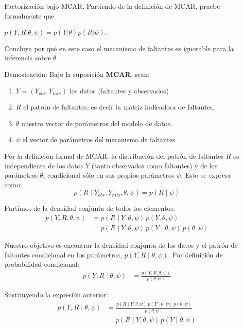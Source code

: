 \documentclass[a4paper,11pt]{article}
\begin{document}
\newpage
\begin{ejercicio}{4}
Factorización bajo MCAR.
Partiendo de la definición de MCAR, pruebe formalmente que

$p(Y, R | \theta, \psi) = p(Y | \theta) p(R | \psi)$.

Concluya por qué en este caso el mecanismo de faltantes es ignorable para la inferencia
sobre $\theta$.
\end{ejercicio}
\begin{demostracion}{Demostración:}
Bajo la suposición \textbf{MCAR}, sean:
\begin{enumerate}
    \item $Y=(Y_{obs},Y_{mis} )$ los datos (faltantes y observados)
    \item $R$ el patrón de faltantes, es decir la matriz indicadora de faltantes.
    \item $\theta$ nuestro vector de parámetros del modelo de datos.
    \item $\psi$ el vector de parámetros del mecanismo de faltantes.
\end{enumerate}

Por la definición formal de MCAR, la distribución del patrón de faltantes $R$ es independiente de los datos $Y$ (tanto observados como faltantes) y de los parámetros $\theta$, condicional sólo en sus propios parámetros $\psi$. Esto se expresa como:
\[
p(R \mid Y_{obs}, Y_{mis}, \theta, \psi) = p(R \mid \psi)
\]

Partimos de la densidad conjunta de todos los elementos:
\begin{align*}
    p(Y, R, \theta, \psi) &= p(R \mid Y, \theta, \psi) \, p(Y, \theta, \psi) \\
    &= p(R \mid Y, \theta, \psi) \, p(Y \mid \theta, \psi) \, p(\theta, \psi)
\end{align*}

Nuestro objetivo es encontrar la densidad conjunta de los datos y el patrón de faltantes condicional en los parámetros, $p(Y, R \mid \theta, \psi)$. Por definición de probabilidad condicional:
\begin{align*}
    p(Y, R \mid \theta, \psi) &= \frac{p(Y, R, \theta, \psi)}{p(\theta, \psi)}
\end{align*}

Sustituyendo la expresión anterior:
\begin{align*}
    p(Y, R \mid \theta, \psi) &= \frac{p(R \mid Y, \theta, \psi) \, p(Y \mid \theta, \psi) \, p(\theta, \psi)}{p(\theta, \psi)} \\
    &= p(R \mid Y, \theta, \psi) \, p(Y \mid \theta, \psi)
\end{align*}


\end{demostracion}
\end{document}

